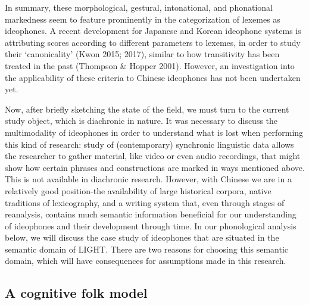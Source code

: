 \documentclass[12pt,article,oneside]{memoir}
\theoremstyle{definition}
\theoremstyle{definition}
\theoremstyle{definition}
\theoremstyle{remark}
\begin{document}
In summary, these morphological, gestural, intonational, and phonational
markedness seem to feature prominently in the categorization of lexemes
as ideophones. A recent development for Japanese and Korean ideophone
systems is attributing scores according to different parameters to
lexemes, in order to study their `canonicality' (Kwon 2015; 2017),
similar to how transitivity has been treated in the past (Thompson \&
Hopper 2001). However, an investigation into the applicability of these
criteria to Chinese ideophones has not been undertaken yet.

Now, after briefly sketching the state of the field, we must turn to the
current study object, which is diachronic in nature. It was necessary to
discuss the multimodality of ideophones in order to understand what is
lost when performing this kind of research: study of (contemporary)
synchronic linguistic data allows the researcher to gather material,
like video or even audio recordings, that might show how certain phrases
and constructions are marked in ways mentioned above. This is not
available in diachronic research. However, with Chinese we are in a
relatively good position-the availability of large historical corpora,
native traditions of lexicography, and a writing system that, even
through stages of reanalysis, contains much semantic information
beneficial for our understanding of ideophones and their development
through time. In our phonological analysis below, we will discuss the
case study of ideophones that are situated in the semantic domain of
LIGHT. There are two reasons for choosing this semantic domain, which
will have consequences for assumptions made in this research.

\subsection{A cognitive folk model}\label{a-cognitive-folk-model}
\end{document}

